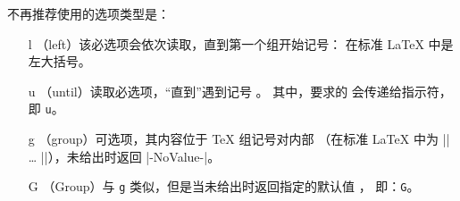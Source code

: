 \documentclass{l3doc}
\begin{document}
不再推荐使用的选项类型是：
\begin{itemize}[font=\ttfamily]
    \item[l] （left）该必选项会依次读取，直到第一个组开始记号：
    在标准 \LaTeX{} 中是左大括号。
    \item[u] （until）读取必选项，“直到”遇到记号 。
    其中，要求的  会传递给指示符，即 \texttt{u}。
    \item[g] （group）可选项，其内容位于 \TeX{} 组记号对内部
    （在标准 \LaTeX{} 中为 |{| \ldots{} |}|），未给出时返回 |-NoValue-|。
    \item[G] （Group）与 \texttt{g} 类似，但是当未给出时返回指定的默认值 ，
    即：\texttt{G}。
\end{itemize}
\end{document}
